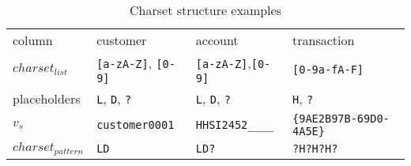 \begin{table}[h]
\centering
\begin{tabular}{l|lll}
\hline
column                & customer                      & account                      & transaction                 \\
\(charset_{list}\)    & \verb|[a-zA-Z]|, \verb|[0-9]| & \verb|[a-zA-Z]|,\verb|[0-9]| & \verb|[0-9a-fA-F]|          \\
placeholders          & \verb|L|, \verb|D|, \verb|?|  & \verb|L|, \verb|D|, \verb|?| & \verb|H|, \verb|?|          \\
\(v_{s}\)             & \verb|customer0001|           & \verb|HHSI2452____|          & \verb|{9AE2B97B-69D0-4A5E}| \\
\(charset_{pattern}\) & \verb|LD|                     & \verb|LD?|                   & \verb|?H?H?H?|              \\ \hline
\end{tabular}
\caption{Charset structure examples}
\label{tab:pd:charsetsplit:charsetpattern}
\end{table}